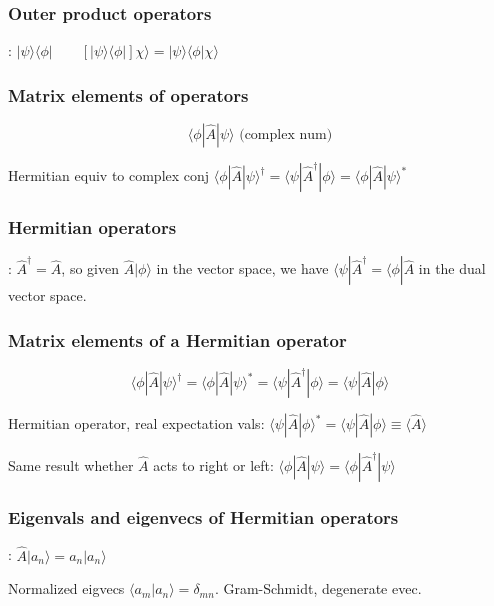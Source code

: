 \subsubsection{Outer product operators}: $| \psi \rangle \langle \phi | \qquad [|\psi \rangle \langle \phi |] \chi \rangle  = | \psi \rangle \langle \phi | \chi \rangle$

\subsubsection{Matrix elements of operators}
$$\langle \phi | \widehat{A} | \psi \rangle \textrm{ (complex num)}$$

Hermitian equiv to complex conj $\langle \phi | \widehat{A} | \psi \rangle^{\dag} = \langle \psi | \widehat{A}^{\dag} | \phi \rangle = \langle \phi | \widehat{A} | \psi \rangle ^*$

\subsubsection{Hermitian operators}: $\widehat{A}^{\dag} = \widehat{A}$, so given $\widehat{A} | \phi \rangle$ in the vector space, we have $\langle \psi | \widehat{A}^{\dag} = \langle \phi | \widehat{A}$ in the dual vector space.

\subsubsection{Matrix elements of a Hermitian operator}
$$\langle \phi | \widehat{A} | \psi \rangle^{\dag} = \langle \phi | \widehat{A} | \psi \rangle^* = \langle \psi | \widehat{A}^{\dag} | \phi \rangle = \langle \psi | \widehat{A} | \phi \rangle$$

Hermitian operator, real expectation vals: $\langle \psi | \widehat{A} | \phi \rangle ^* = \langle \psi | \widehat{A} | \phi \rangle \equiv \langle \widehat{A} \rangle$

Same result whether $\widehat{A}$ acts to right or left: $\langle \phi | \widehat{A} | \psi \rangle = \langle \phi | \widehat{A}^{\dag} | \psi \rangle$

\subsubsection{Eigenvals and eigenvecs of Hermitian operators}: $\widehat{A} |a_n \rangle = a_n | a_n \rangle$

Normalized eigvecs $\langle a_m | a_n \rangle = \delta_{mn}$. Gram-Schmidt, degenerate evec.


